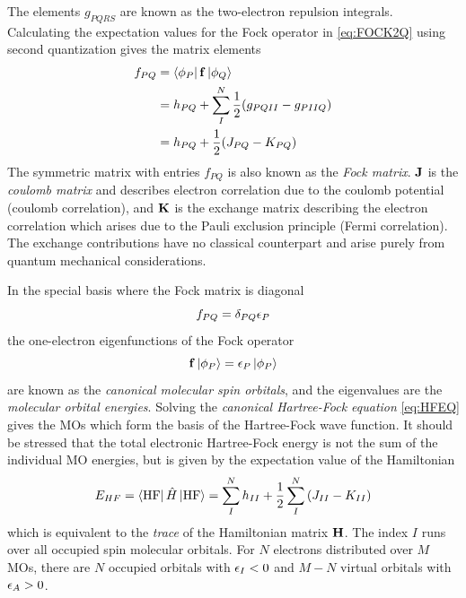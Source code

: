 \noindent The elements $g_{PQRS}$ are known as the two-electron repulsion integrals. Calculating the expectation values for the Fock operator in \ref{eq:FOCK2Q} using second quantization gives the matrix elements \cite{Hel2000}
\begin{equation}
\begin{split}
f_{PQ} &= \bra{\phi_P} \mathbf{f} \ket{\phi_Q} \\
	&= h_{PQ} + \sum_{I}^N \frac{1}{2} (g_{PQII} - g_{PIIQ}) \\
	&= h_{PQ} + \frac{1}{2} (J_{PQ} - K_{PQ})
\end{split}
\end{equation} 
\noindent The symmetric matrix with entries $f_{PQ}$ is also known as the \emph{Fock matrix}. $\mathbf{J}$ is the \emph{coulomb matrix} and describes electron correlation due to the coulomb potential (coulomb correlation), and $\mathbf{K}$ is the exchange matrix describing the electron correlation which arises due to the Pauli exclusion principle (Fermi correlation). The exchange contributions have no classical counterpart and arise purely from quantum mechanical considerations. 

In the special basis where the Fock matrix is diagonal
\begin{equation}
f_{PQ} = \delta_{PQ} \epsilon_P 
\end{equation}
\noindent the one-electron eigenfunctions of the Fock operator 
\begin{equation}
\mathbf{f} \ket{\phi_P} = \epsilon_P \ket{\phi_P} 
\label{eq:HFEQ}
\end{equation} 
\noindent are known as the \emph{canonical molecular spin orbitals}, and the eigenvalues are the \emph{molecular orbital energies}. Solving the \emph{canonical Hartree-Fock equation} \ref{eq:HFEQ} gives the MOs which form the basis of the Hartree-Fock wave function. It should be stressed that the total electronic Hartree-Fock energy is not the sum of the individual MO energies, but is given by the expectation value of the Hamiltonian 
\begin{equation}
E_{HF} = \bra{\text{HF}}\hat{H}\ket{\text{HF}} = \sum_{I}^{N} h_{II} + \frac{1}{2} \sum_{I}^{N} \left( J_{II} - K_{II} \right) 
\end{equation}
\noindent which is equivalent to the \emph{trace} of the Hamiltonian matrix $\mathbf{H}$. The index $I$ runs over all occupied spin molecular orbitals. For $N$ electrons distributed over $M$ MOs, there are $N$ occupied orbitals with $\epsilon_I < 0$ and $M-N$ virtual orbitals with $\epsilon_A > 0$. 

